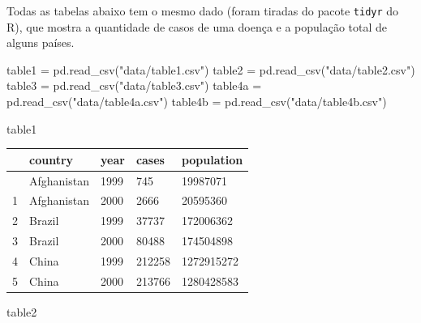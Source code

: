 \documentclass[
  portuguese,
  letterpaper,
  DIV=11,
  numbers=noendperiod]{scrreprt}
\newenvironment{Shaded}{\begin{snugshade}}{\end{snugshade}}
\newcommand{\NormalTok}[1]{\textcolor[rgb]{0.00,0.23,0.31}{#1}}
\newcommand{\OperatorTok}[1]{\textcolor[rgb]{0.37,0.37,0.37}{#1}}
\newcommand{\StringTok}[1]{\textcolor[rgb]{0.13,0.47,0.30}{#1}}
\theoremstyle{definition}
\theoremstyle{remark}
\begin{document}
Todas as tabelas abaixo tem o mesmo dado (foram tiradas do pacote
\texttt{tidyr} do R), que mostra a quantidade de casos de uma doença e a
população total de alguns países.

\begin{Shaded}
\begin{Highlighting}[]
\NormalTok{table1 }\OperatorTok{=}\NormalTok{ pd.read\_csv(}\StringTok{"data/table1.csv"}\NormalTok{)}
\NormalTok{table2 }\OperatorTok{=}\NormalTok{ pd.read\_csv(}\StringTok{"data/table2.csv"}\NormalTok{)}
\NormalTok{table3 }\OperatorTok{=}\NormalTok{ pd.read\_csv(}\StringTok{"data/table3.csv"}\NormalTok{)}
\NormalTok{table4a }\OperatorTok{=}\NormalTok{ pd.read\_csv(}\StringTok{"data/table4a.csv"}\NormalTok{)}
\NormalTok{table4b }\OperatorTok{=}\NormalTok{ pd.read\_csv(}\StringTok{"data/table4b.csv"}\NormalTok{)}
\end{Highlighting}
\end{Shaded}

\begin{Shaded}
\begin{Highlighting}[]
\NormalTok{table1}
\end{Highlighting}
\end{Shaded}

\begin{longtable}[]{@{}lllll@{}}
\toprule\noalign{}
& country & year & cases & population \\
\midrule\noalign{}
\endhead
\bottomrule\noalign{}
\endlastfoot
0 & Afghanistan & 1999 & 745 & 19987071 \\
1 & Afghanistan & 2000 & 2666 & 20595360 \\
2 & Brazil & 1999 & 37737 & 172006362 \\
3 & Brazil & 2000 & 80488 & 174504898 \\
4 & China & 1999 & 212258 & 1272915272 \\
5 & China & 2000 & 213766 & 1280428583 \\
\end{longtable}

\begin{Shaded}
\begin{Highlighting}[]
\NormalTok{table2}
\end{Highlighting}
\end{Shaded}
\end{document}
